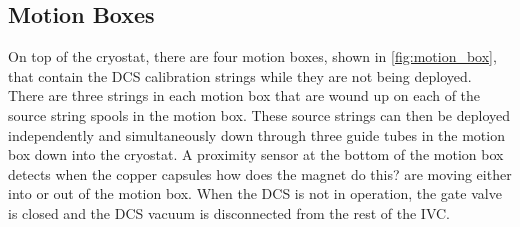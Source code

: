 \subsection{Motion Boxes}
On top of the cryostat, there are four motion boxes, shown in \autoref{fig:motion_box}, that contain the DCS calibration strings while they are not being deployed. There are three strings in each motion box that are wound up on each of the source string spools in the motion box. These source strings can then be deployed independently and simultaneously down through three guide tubes in the motion box down into the cryostat. A proximity sensor at the bottom of the motion box detects when the copper capsules \color{red} how does the magnet do this? \color{black} are moving either into or out of the motion box. When the DCS is not in operation, the gate valve is closed and the DCS vacuum is disconnected from the rest of the IVC.
